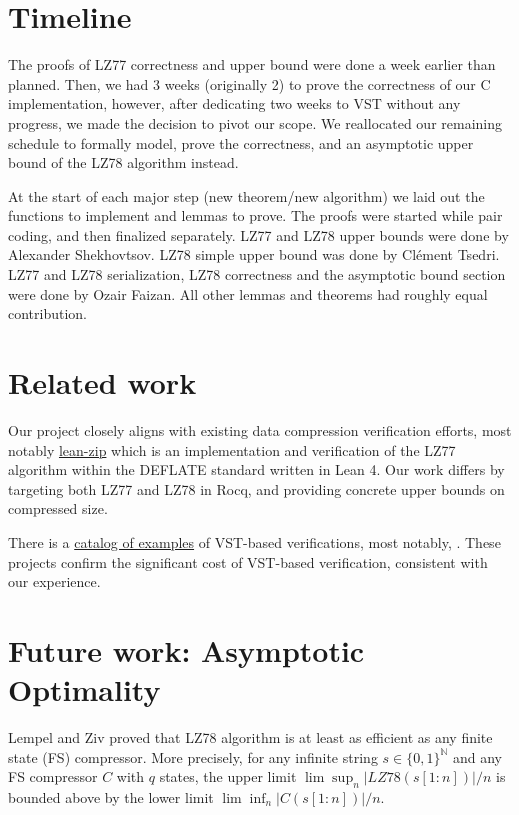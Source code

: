 \documentclass[
  a4paper, twocolumn, DIV=calc]{scrartcl}
\begin{document}
\section{Timeline}
The proofs of LZ77 correctness and upper bound were done a week earlier than
planned.
Then, we had 3 weeks (originally 2) to prove the correctness of our C
implementation, however, after dedicating two weeks to VST without any
progress, we made the decision to pivot our scope. We reallocated our remaining
schedule to formally model, prove the correctness, and an asymptotic upper bound
of the LZ78 algorithm instead.

At the start of each major step (new theorem/new algorithm) we laid out the
functions to implement and lemmas to prove. The proofs were started while
pair coding, and then finalized separately.
LZ77 and LZ78 upper bounds were done by Alexander Shekhovtsov.
LZ78 simple upper bound was done by Clément Tsedri.
LZ77 and LZ78 serialization, LZ78 correctness and the asymptotic bound section
were done by Ozair Faizan.
All other lemmas and theorems had roughly equal contribution. 


\section{Related work}

Our project closely aligns with existing data compression verification efforts,
most notably \href{https://github.com/kim-em/lean-zip}{lean-zip} which is an
implementation and verification of the LZ77 algorithm within the DEFLATE
standard written in Lean 4. Our work differs by targeting both LZ77 and LZ78 in
Rocq, and providing concrete upper bounds on compressed size.

There is a
\href{https://github.com/PrincetonUniversity/VST/blob/master/doc/catalog-of-examples.md}{catalog
of examples} of VST-based verifications, most notably,
\cite{VSTSHA}.
These projects confirm the significant cost of VST-based verification,
consistent with our experience.

\section{Future work: Asymptotic Optimality}
Lempel and Ziv \cite{ZivLempel1978} proved that LZ78 algorithm is at least as efficient as any finite state (FS) compressor. More precisely, for any infinite string $s \in \{0, 1\}^{\mathbb{N}}$ and any FS compressor $C$ with $q$ states, the upper limit $\lim \sup_n |\textit{LZ78}(s[1:n])|/n$ is bounded above by the lower limit $\lim \inf_n |C(s[1:n])|/n$.
\end{document}
